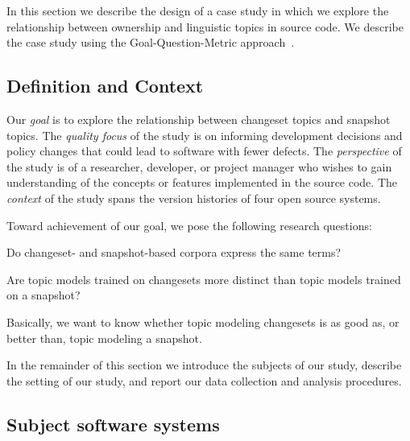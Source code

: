 
In this section we describe the design of a case study in which we
explore the relationship between ownership and linguistic topics in source code.
We describe the case study using the Goal-Question-Metric approach~\cite{Basili-etal:94}.

\subsection{Definition and Context}

Our \textit{goal} is to explore the relationship between changeset topics and snapshot topics.
The \textit{quality focus} of the study is on informing development decisions and policy changes
that could lead to software with fewer defects.
The \textit{perspective} of the study is of a researcher, developer, or project manager who wishes
to gain understanding of the concepts or features implemented in the source code.
The \textit{context} of the study spans the version histories of four open source systems.

Toward achievement of our goal, we pose the following research questions:
\begin{description}[font=\itshape\mdseries,leftmargin=10mm,style=sameline]
    \item[RQ1] Do changeset- and snapshot-based corpora express the same terms?
    \item[RQ2] Are topic models trained on changesets more distinct than topic models trained on a snapshot?
\end{description}
Basically, we want to know whether topic modeling changesets is as good as, or better than, topic modeling a snapshot.

In the remainder of this section we introduce the subjects of our study,
describe the setting of our study, and report our data collection and analysis procedures.


\subsection{Subject software systems}

